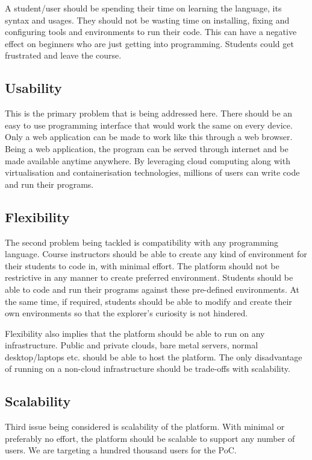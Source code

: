\documentclass[DD]{iitmdiss}
\begin{document}
A student/user should be spending their time on learning the language, its syntax and usages. They should not be wasting time on installing, fixing and configuring tools and environments to run their code. This can have a negative effect on beginners who are just getting into programming. Students could get frustrated and leave the course.

\subsection{Usability}
This is the primary problem that is being addressed here. There should be an easy to use programming interface that would work the same on every device. Only a web application can be made to work like this through a web browser. Being a web application, the program can be served through internet and be made available anytime anywhere. By leveraging cloud computing along with virtualisation and containerisation technologies, millions of users can write code and run their programs.

\subsection{Flexibility}
The second problem being tackled is compatibility with any programming language. Course instructors should be able to create any kind of environment for their students to code in, with minimal effort. The platform should not be restrictive in any manner to create preferred environment. Students should be able to code and run their programs against these pre-defined environments. At the same time, if required, students should be able to modify and create their own environments so that the explorer's curiosity is not hindered.

Flexibility also implies that the platform should be able to run on any infrastructure. Public and private clouds, bare metal servers, normal desktop/laptops etc. should be able to host the platform. The only disadvantage of running on a non-cloud infrastructure should be trade-offs with scalability.

\subsection{Scalability}
Third issue being considered is scalability of the platform. With minimal or preferably no effort, the platform should be scalable to support any number of users. We are targeting a hundred thousand users for the PoC. 
\end{document}
